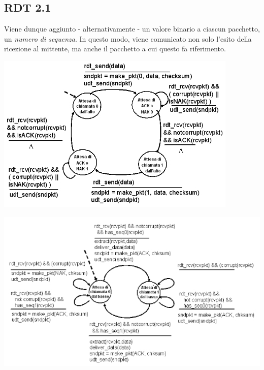 \subsection{RDT 2.1}
Viene dunque aggiunto - alternativamente - un valore binario a ciascun pacchetto, un \textit{numero di sequenza}.
In questo modo, viene comunicato non solo l'esito della ricezione al mittente, ma anche il pacchetto a cui questo fa riferimento. \\
\begin{minipage}[t]{0.5\textwidth}
    \begin{center}
        \includegraphics[width=.8\textwidth]{res/fsm-rdt-21-sender.jpg} \hfill
    \end{center}
\end{minipage}
\begin{minipage}[t]{0.5\textwidth}
    \begin{center}
        \includegraphics[width=.8\textwidth]{res/fsm-rdt-21-receiver.jpg} \hfill
    \end{center}
\end{minipage}
\newpage

